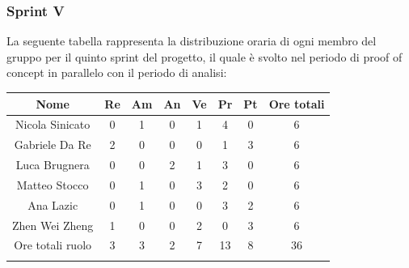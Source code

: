 \newpage
\subsubsection{Sprint V}
%
La seguente tabella rappresenta la distribuzione oraria di ogni membro del gruppo per il quinto sprint del progetto, il quale è svolto nel periodo di proof of concept in parallelo con il periodo di analisi:

	\setlength\extrarowheight{5pt}
	\begin{tabularx}{\textwidth}{|ccccccc|c|}
		\hline
		\rowcolor{white}
		\textbf{Nome} & \textbf{Re} & \textbf{Am} & \textbf{An} & \textbf{Ve} & \textbf{Pr}& \textbf{Pt} & \textbf{Ore totali} \\
		\hline
		Nicola Sinicato &0&1&0&1&4&0&6 \\
		Gabriele Da Re &2&0&0&0&1&3&6 \\
		Luca Brugnera &0&0&2&1&3&0&6 \\
		Matteo Stocco &0&1&0&3&2&0&6 \\
		Ana Lazic &0&1&0&0&3&2&6 \\
		Zhen Wei Zheng &1&0&0&2&0&3&6 \\
		\hline
		Ore totali ruolo &3&3&2&7&13&8&36 \\
		\hline
		\rowcolor{white}
		\caption{Distribuzione oraria durante il quinto sprint per ruolo e persona}
	\end{tabularx}
	\vspace{10pt}
	
